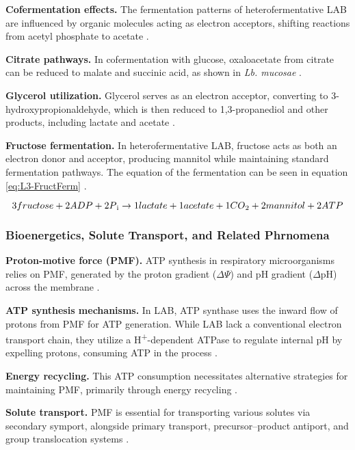 \textbf{Cofermentation effects.} The fermentation patterns of heterofermentative LAB are influenced by organic molecules acting as electron acceptors, shifting reactions from acetyl phosphate to acetate \cite*{L3-LAB}.

\textbf{Citrate pathways.} In cofermentation with glucose, oxaloacetate from citrate can be reduced to malate and succinic acid, as shown in \textit{Lb. mucosae} \cite*{L3-LAB}.

\textbf{Glycerol utilization.} Glycerol serves as an electron acceptor, converting to 3-hydroxypropionaldehyde, which is then reduced to 1,3-propanediol and other products, including lactate and acetate \cite*{L3-LAB}.

\textbf{Fructose fermentation.} In heterofermentative LAB, fructose acts as both an electron donor and acceptor, producing mannitol while maintaining standard fermentation pathways. The equation of the fermentation can be seen in equation \ref*{eq:L3-FructFerm} \cite*{L3-LAB}.

\begin{equation}
    3fructose + 2ADP + 2P\textsubscript{i} \rightarrow 1lactate + 1acetate + 1CO\textsubscript{2} + 2 mannitol + 2ATP
    \label{eq:L3-FructFerm}
\end{equation}

\subsubsection{Bioenergetics, Solute Transport, and Related Phrnomena}
\textbf{Proton-motive force (PMF).} ATP synthesis in respiratory microorganisms relies on PMF, generated by the proton gradient ($\Delta$$\Psi$) and pH gradient ($\Delta$pH) across the membrane \cite*{L3-LAB}.

\textbf{ATP synthesis mechanisms.} In LAB, ATP synthase uses the inward flow of protons from PMF for ATP generation. While LAB lack a conventional electron transport chain, they utilize a H\textsuperscript{+}-dependent ATPase to regulate internal pH by expelling protons, consuming ATP in the process \cite*{L3-LAB}.

\textbf{Energy recycling.} This ATP consumption necessitates alternative strategies for maintaining PMF, primarily through energy recycling \cite*{L3-LAB}.

\textbf{Solute transport.} PMF is essential for transporting various solutes via secondary symport, alongside primary transport, precursor–product antiport, and group translocation systems \cite*{L3-LAB}.

